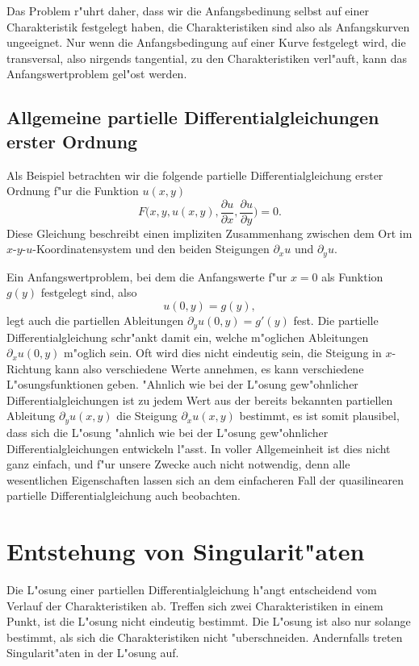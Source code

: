 Das Problem r"uhrt daher, dass wir die Anfangsbedinung selbst auf einer
Charakteristik festgelegt haben, die Charakteristiken sind also als
Anfangskurven ungeeignet. Nur wenn die Anfangsbedingung auf einer Kurve
festgelegt wird, die transversal, also nirgends tangential, zu den
Charakteristiken verl"auft, kann das Anfangswertproblem gel"ost werden.

\subsection{Allgemeine partielle Differentialgleichungen erster Ordnung}
Als Beispiel betrachten wir die folgende partielle Differentialgleichung
erster Ordnung f"ur die Funktion $u(x,y)$
\begin{equation}
F\biggl(
x,y,u(x,y),\frac{\partial u}{\partial x},\frac{\partial u}{\partial y}
\biggr)=0.
\end{equation}
Diese Gleichung beschreibt einen impliziten Zusammenhang zwischen
dem Ort im $x$-$y$-$u$-Ko\-or\-di\-na\-ten\-sys\-tem und den beiden Steigungen
$\partial_xu$ und $\partial_yu$.

Ein Anfangswertproblem, bei dem die Anfangswerte f"ur $x=0$ als
Funktion $g(y)$ festgelegt sind, also
\[
u(0,y)=g(y),
\]
legt auch die
partiellen Ableitungen $\partial_y u(0,y)=g'(y)$ fest.  Die partielle
Differentialgleichung schr"ankt damit ein, welche m"oglichen Ableitungen
$\partial_xu(0,y)$ m"oglich sein. Oft wird dies nicht eindeutig sein,
die Steigung in $x$-Richtung kann also verschiedene Werte annehmen,
es kann verschiedene L"osungsfunktionen geben. "Ahnlich wie bei der
L"osung gew"ohnlicher Differentialgleichungen ist zu jedem Wert
aus der bereits bekannten partiellen Ableitung $\partial_yu(x,y)$
die Steigung $\partial_xu(x,y)$ bestimmt, es ist somit plausibel, dass
sich die L"osung "ahnlich wie bei der L"osung gew"ohnlicher Differentialgleichungen
entwickeln l"asst. In voller Allgemeinheit ist dies nicht ganz einfach,
und f"ur unsere Zwecke auch nicht notwendig, denn alle wesentlichen
Eigenschaften lassen sich an dem einfacheren Fall der quasilinearen
partielle Differentialgleichung auch beobachten.


\section{Entstehung von Singularit"aten}
Die L"osung einer partiellen Differentialgleichung h"angt entscheidend
vom Verlauf der Charakteristiken ab. Treffen sich zwei Charakteristiken
in einem Punkt, ist die L"osung nicht eindeutig bestimmt. Die L"osung
ist also nur solange bestimmt, als sich die Charakteristiken nicht "uberschneiden.
Andernfalls treten Singularit"aten in der L"osung auf.

